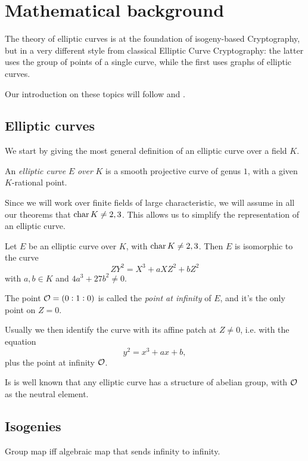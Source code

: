 \chapter{Mathematical background}

The theory of elliptic curves is at the foundation of isogeny-based Cryptography, but in a very different style from classical Elliptic Curve Cryptography: the latter uses the group of points of a single curve, while the first uses graphs of elliptic curves.

Our introduction on these topics will follow \cite{Silverman} and \cite{DeFeo_intro}.

\section{Elliptic curves}

We start by giving the most general definition of an elliptic curve over a field $K$.

\begin{definition}
    An \emph{elliptic curve} $E$ \emph{over} $K$ is a smooth projective curve of genus $1$, with a given $K$-rational point.
\end{definition}

Since we will work over finite fields of large characteristic, we will assume in all our theorems that $\operatorname{char} K\neq 2,3$. This allows us to simplify the representation of an elliptic curve.

\begin{proposition}
    Let $E$ be an elliptic curve over $K$, with $\operatorname{char} K\neq 2,3$. Then $E$ is isomorphic to the curve $$ZY^2=X^3+aXZ^2+bZ^2$$ with $a,b\in K$ and $4a^3+27b^2\neq0$.
    
    The point $\mathcal{O}=(0:1:0)$ is called the \emph{point at infinity} of $E$, and it's the only point on $Z=0$.
\end{proposition}

Usually we then identify the curve with its affine patch at $Z\neq0$, i.e. with the equation $$y^2=x^3+ax+b,$$
plus the point at infinity $\mathcal{O}$.

Is is well known that any elliptic curve has a structure of abelian group, with $\mathcal{O}$ as the neutral element.

\section{Isogenies}

\begin{proposition}
    Group map iff algebraic map that sends infinity to infinity.
\end{proposition}

